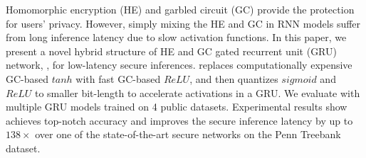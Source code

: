 Homomorphic encryption (HE) and garbled circuit (GC) provide the protection for users' privacy. However, simply mixing the HE and GC in RNN models suffer from long inference latency due to slow activation functions. In this paper, we present a novel hybrid structure of HE and GC gated recurrent unit (GRU) network, \cryptogru, for low-latency secure inferences. \cryptogru replaces computationally expensive GC-based $tanh$ with fast GC-based $ReLU$, and then quantizes $sigmoid$ and $ReLU$ to smaller bit-length to accelerate activations in a GRU. We evaluate \cryptogru with multiple GRU models trained on 4 public datasets. Experimental results show \cryptogru achieves top-notch accuracy and improves the secure inference latency by up to $138\times$ over one of the state-of-the-art secure networks on the Penn Treebank dataset.
